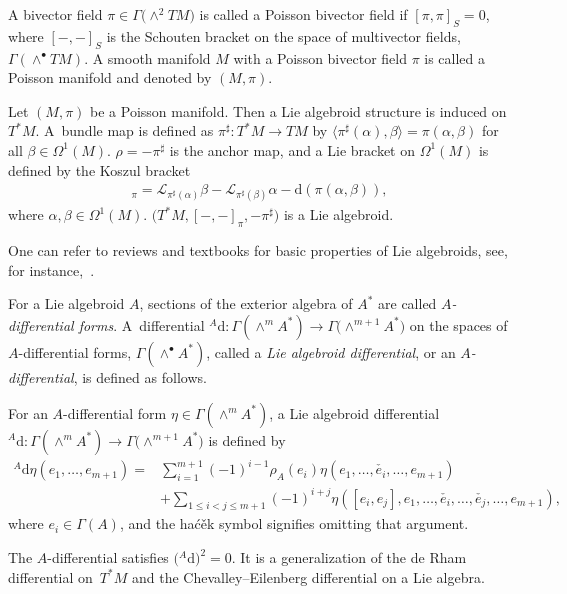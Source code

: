 \documentclass[pdftex]{sigma}
\numberwithin{equation}{section}
\newcommand{\calL}{{\mathcal L}}
\newcommand{\rhoa}{{\rho_A}}
\newcommand{\rd}{\mathrm{d}}
\begin{document}
\begin{Example}\label{Poisson}
%
A bivector field $\pi \in \Gamma\bigl(\wedge^2 TM\bigr)$ is called a Poisson bivector field if $[\pi, \pi]_S =0$, where $[-,-]_S$ is the Schouten bracket on the space of multivector fields, $\Gamma(\wedge^{\bullet} TM)$.
A smooth manifold $M$ with a Poisson bivector field $\pi$ is called a Poisson manifold and denoted by $(M, \pi)$.


%
Let $(M, \pi)$ be a Poisson manifold. Then a Lie algebroid structure is induced on $T^*M$.
A~bundle map is defined as
$\pi^{\sharp}\colon T^*M \rightarrow TM$ by $\bigl\langle\pi^{\sharp}(\alpha),\beta\bigr\rangle
= \pi(\alpha, \beta)$ for all $\beta \in \Omega^1(M)$.
$\rho= - \pi^{\sharp}$ is the anchor map, and
a Lie bracket on $\Omega^1(M)$ is defined by the Koszul bracket
\begin{gather*}
[\alpha, \beta]_{\pi} = \calL_{\pi^{\sharp} (\alpha)}\beta - \calL_{\pi^{\sharp} (\beta)} \alpha - \rd(\pi(\alpha, \beta)),
\end{gather*}
where $\alpha, \beta \in \Omega^1(M)$.
$\bigl(T^*M, [-, -]_{\pi}, -\pi^{\sharp}\bigr)$ is a Lie algebroid.
\end{Example}

One can refer to reviews and textbooks for basic properties of Lie algebroids, see, for instance,~\cite{Mackenzie}.

For a Lie algebroid $A$, sections of the exterior algebra of $A^*$ are called \textit{$A$-differential forms}.
A~differential ${}^A \rd\colon \Gamma(\wedge^m A^*)
\rightarrow \Gamma\bigl(\wedge^{m+1} A^*\bigr)$ on the spaces of $A$-differential forms, $\Gamma(\wedge^{\bullet} A^*)$,
called a \textit{Lie algebroid differential}, or an \textit{$A$-differential},
is defined as follows.
\begin{Definition}
For an $A$-differential form $\eta \in \Gamma(\wedge^m A^*)$,
a Lie algebroid differential ${}^A \rd\colon \allowbreak\Gamma(\wedge^m A^*)
\rightarrow \Gamma\bigl(\wedge^{m+1} A^*\bigr)$ is defined by
\begin{align*}%
{}^A \rd \eta(e_1, \ldots, e_{m+1})
={}& \sum_{i=1}^{m+1} (-1)^{i-1} \rhoa(e_i) \eta(e_1, \ldots,
\check{e_i}, \ldots, e_{m+1})
 \\ &
+ \sum_{1 \leq i < j \leq m+1} (-1)^{i+j} \eta([e_i, e_j], e_1, \ldots, \check{e_i}, \ldots, \check{e_j}, \ldots, e_{m+1}),
\end{align*}
where $e_i \in \Gamma(A)$, and the ha\'{c}\v{e}k symbol signifies omitting that argument.
\end{Definition}
The $A$-differential satisfies $\bigl({}^A \rd\bigr)^2=0$.
It is a generalization of the de Rham differential on~$T^*M$ and the Chevalley--Eilenberg differential on a Lie algebra.
\end{document}
